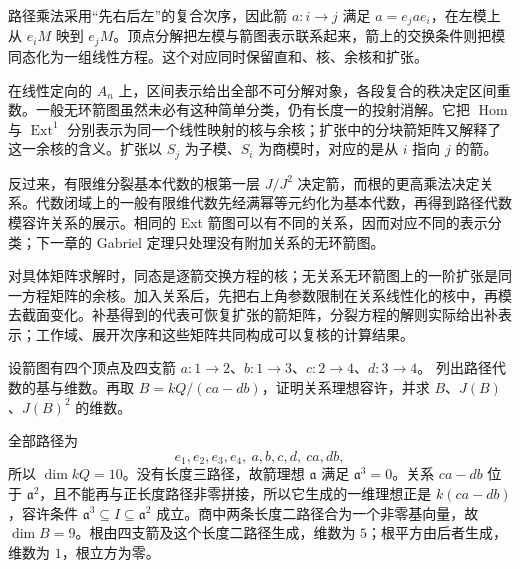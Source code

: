 






\begin{chaptersummary}
	路径乘法采用“先右后左”的复合次序，因此箭 \(a:i\to j\) 满足 \(a=e_jae_i\)，在左模上从 \(e_iM\) 映到 \(e_jM\)。顶点分解把左模与箭图表示联系起来，箭上的交换条件则把模同态化为一组线性方程。这个对应同时保留直和、核、余核和扩张。

	\ProseParagraphBreak

	在线性定向的 \(A_n\) 上，区间表示给出全部不可分解对象，各段复合的秩决定区间重数。一般无环箭图虽然未必有这种简单分类，仍有长度一的投射消解。它把 \(\operatorname{Hom}\) 与 \(\operatorname{Ext}^1\) 分别表示为同一个线性映射的核与余核；扩张中的分块箭矩阵又解释了这一余核的含义。扩张以 \(S_j\) 为子模、\(S_i\) 为商模时，对应的是从 \(i\) 指向 \(j\) 的箭。

	\ProseParagraphBreak

	反过来，有限维分裂基本代数的根第一层 \(J/J^2\) 决定箭，而根的更高乘法决定关系。代数闭域上的一般有限维代数先经满幂等元约化为基本代数，再得到路径代数模容许关系的展示。相同的 Ext 箭图可以有不同的关系，因而对应不同的表示分类；下一章的 Gabriel 定理只处理没有附加关系的无环箭图。

	\ProseParagraphBreak

	对具体矩阵求解时，同态是逐箭交换方程的核；无关系无环箭图上的一阶扩张是同一方程矩阵的余核。加入关系后，先把右上角参数限制在关系线性化的核中，再模去截面变化。补基得到的代表可恢复扩张的箭矩阵，分裂方程的解则实际给出补表示；工作域、展开次序和这些矩阵共同构成可以复核的计算结果。
\end{chaptersummary}

\BookExercises

\begin{exercise}\label{b5:ex:09-diamond-paths}
	设箭图有四个顶点及四支箭 \(a:1\to2\)、\(b:1\to3\)、\(c:2\to4\)、\(d:3\to4\)。 列出路径代数的基与维数。再取 \(B=kQ/(ca-db)\)，证明关系理想容许，并求 \(B\)、\(J(B)\)、\(J(B)^2\) 的维数。
\end{exercise}
\begin{solution}
	全部路径为
	\[
		e_1,e_2,e_3,e_4,\ a,b,c,d,\ ca,db,
	\]
	所以 \(\dim kQ=10\)。没有长度三路径，故箭理想 \(\mathfrak a\) 满足 \(\mathfrak a^3=0\)。关系 \(ca-db\) 位于 \(\mathfrak a^2\)，且不能再与正长度路径非零拼接，所以它生成的一维理想正是 \(k(ca-db)\)，容许条件 \(\mathfrak a^3\subseteq I\subseteq\mathfrak a^2\) 成立。商中两条长度二路径合为一个非零基向量，故 \(\dim B=9\)。根由四支箭及这个长度二路径生成，维数为 \(5\)；根平方由后者生成，维数为 \(1\)，根立方为零。
\end{solution}

